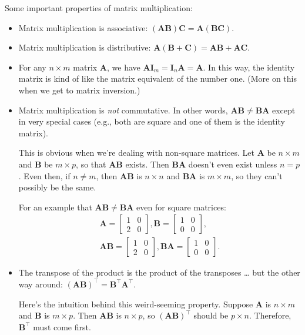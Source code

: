 \documentclass[12pt,oneside,openany]{book}
\begin{document}
Some important properties of matrix multiplication:

\begin{itemize}
\item
  Matrix multiplication is associative:
  \((\mathbf{A} \mathbf{B}) \mathbf{C} = \mathbf{A} (\mathbf{B} \mathbf{C})\).
\item
  Matrix multiplication is distributive:
  \(\mathbf{A} (\mathbf{B} + \mathbf{C}) = \mathbf{A} \mathbf{B} + \mathbf{A} \mathbf{C}\).
\item
  For any \(n \times m\) matrix \(\mathbf{A}\), we have
  \(\mathbf{A} \mathbf{I}_m = \mathbf{I}_n \mathbf{A} = \mathbf{A}\). In
  this way, the identity matrix is kind of like the matrix equivalent of
  the number one. (More on this when we get to matrix inversion.)
\item
  Matrix multiplication is \emph{not} commutative. In other words,
  \(\mathbf{A} \mathbf{B} \neq \mathbf{B} \mathbf{A}\) except in very
  special cases (e.g., both are square and one of them is the identity
  matrix).

  This is obvious when we're dealing with non-square matrices. Let
  \(\mathbf{A}\) be \(n \times m\) and \(\mathbf{B}\) be \(m \times p\),
  so that \(\mathbf{A} \mathbf{B}\) exists. Then
  \(\mathbf{B} \mathbf{A}\) doesn't even exist unless \(n = p\). Even
  then, if \(n \neq m\), then \(\mathbf{A} \mathbf{B}\) is
  \(n \times n\) and \(\mathbf{B} \mathbf{A}\) is \(m \times m\), so
  they can't possibly be the same.

  For an example that
  \(\mathbf{A} \mathbf{B} \neq \mathbf{B} \mathbf{A}\) even for square
  matrices: \[\begin{gathered}
  \mathbf{A} = \begin{bmatrix}
    1 & 0 \\
    2 & 0
  \end{bmatrix},
  \mathbf{B} = \begin{bmatrix}
    1 & 0 \\
    0 & 0
  \end{bmatrix}, \\
  \mathbf{A} \mathbf{B} = \begin{bmatrix}
    1 & 0 \\
    2 & 0
  \end{bmatrix},
  \mathbf{B} \mathbf{A} = \begin{bmatrix}
    1 & 0 \\
    0 & 0
  \end{bmatrix}.
  \end{gathered}
  \]
\item
  The transpose of the product is the product of the transposes \ldots{}
  but the other way around:
  \((\mathbf{A} \mathbf{B})^\top = \mathbf{B}^\top \mathbf{A}^\top\).

  Here's the intuition behind this weird-seeming property. Suppose
  \(\mathbf{A}\) is \(n \times m\) and \(\mathbf{B}\) is \(m \times p\).
  Then \(\mathbf{A} \mathbf{B}\) is \(n \times p\), so
  \((\mathbf{A} \mathbf{B})^\top\) should be \(p \times n\). Therefore,
  \(\mathbf{B}^\top\) must come first.
\end{itemize}
\end{document}
